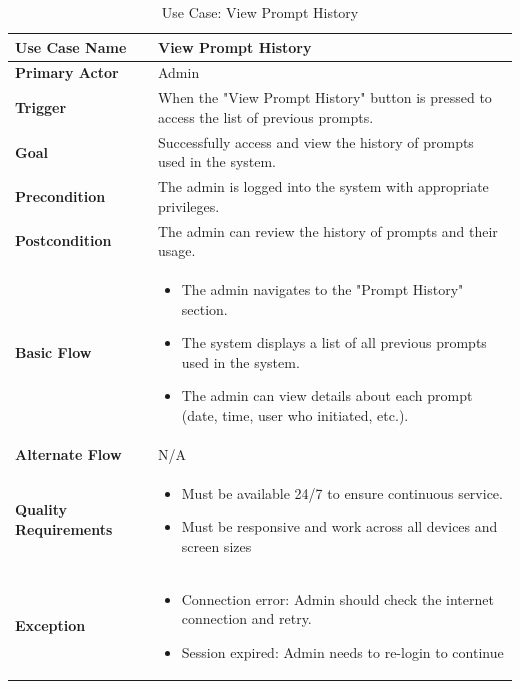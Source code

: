 \documentclass[12pt]{report}
\begin{document}
\clearpage
\begin{table}[h!]

\begin{tabular}{|p{3.5cm}|p{10cm}|}
\hline
\textbf{Use Case Name} & View Prompt History \\ 
\hline
\textbf{Primary Actor} & Admin\\ 
\hline
\textbf{Trigger} & When the "View Prompt History" button is pressed to access the list of previous prompts. \\ 
\hline
\textbf{Goal} & Successfully access and view the history of prompts used in the system. \\ 
\hline
\textbf{Precondition} & The admin is logged into the system with appropriate privileges. \\ 
\hline
\textbf{Postcondition} & The admin can review the history of prompts and their usage. \\ 
\hline
\textbf{Basic Flow} & 
\begin{itemize}
    \item The admin navigates to the "Prompt History" section.
    \item The system displays a list of all previous prompts used in the system.
    \item The admin can view details about each prompt (date, time, user who initiated, etc.).
\end{itemize} \\ 
\hline
\textbf{Alternate Flow} & N/A \\ 
\hline
\textbf{Quality Requirements} & 
\begin{itemize}
    \item Must be available 24/7 to ensure continuous service.
    \item Must be responsive and work across all devices and screen sizes
\end{itemize} \\ 
\hline
\textbf{Exception} & 
\begin{itemize}
    \item Connection error: Admin should check the internet connection and retry.
    \item Session expired: Admin needs to re-login to continue
\end{itemize} \\ 
\hline
\end{tabular}

\caption{Use Case: View Prompt History}
\end{table}
\clearpage
\end{document}

